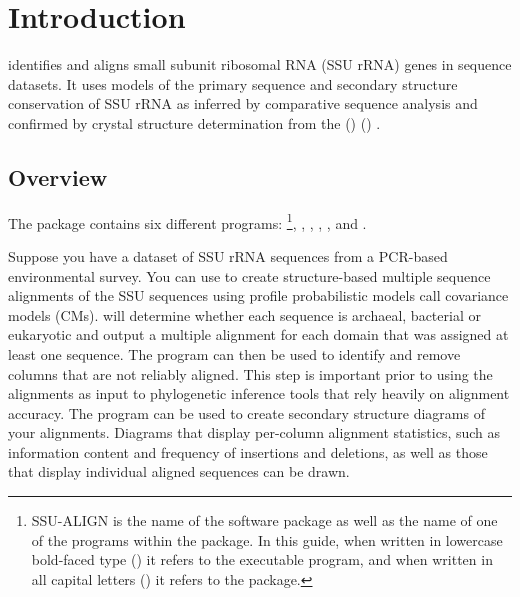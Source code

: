 \section{Introduction}

 identifies and aligns small subunit ribosomal RNA
(SSU rRNA) genes in sequence datasets. It uses models of the primary
sequence and secondary structure conservation of SSU rRNA as inferred
by comparative sequence analysis and confirmed by crystal structure
determination from the  () 
()
\cite{CannoneGutell02}.

\subsection{Overview}
The  package contains six different
programs: \footnote{SSU-ALIGN is the name of the
  software package as well as the name of one of the programs within
  the package. In this guide, when written in lowercase bold-faced
  type () it refers to the executable program, and
  when written in all capital letters () it refers to
  the package.},
, , 
, , and . 

Suppose you have a dataset of SSU rRNA sequences from a PCR-based
environmental survey. You can use  to create
structure-based multiple sequence alignments of the
SSU sequences using profile probabilistic models call covariance
models (CMs).  will determine whether each sequence
is archaeal, bacterial or eukaryotic and output a multiple alignment
for each domain that was assigned at least one sequence. 
The  program can then be used to identify and remove
columns that are not reliably aligned. This step is important prior to using the
alignments as input to phylogenetic inference tools that rely heavily
on alignment accuracy.  
The  program can be used to create secondary
structure diagrams of your alignments. Diagrams that display per-column
alignment statistics, such as information content and frequency of
insertions and deletions, as well as those that display individual
aligned sequences can be drawn.

